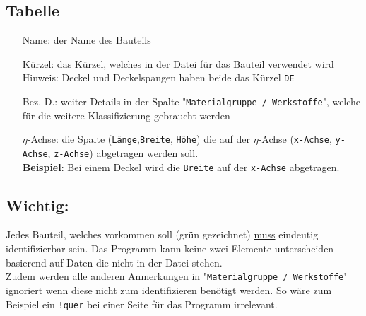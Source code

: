 \documentclass[12pt]{article}
\begin{document}
	\subsection{Tabelle}
		\begin{itemize}
			\item[Name:] der Name des Bauteils
			\item[Kürzel:] das Kürzel, welches in der Datei für das Bauteil verwendet wird\\ 
				Hinweis: Deckel und Deckelspangen haben beide das Kürzel \texttt{DE}
			\item[Bez.-D.:] weiter Details in der Spalte "\texttt{Materialgruppe / Werkstoffe}", welche für die weitere Klassifizierung gebraucht werden
			\item[$\eta$-Achse:] die Spalte (\texttt{Länge},\texttt{Breite}, \texttt{Höhe}) die auf der $\eta$-Achse (\texttt{x-Achse}, \texttt{y-Achse}, \texttt{z-Achse}) abgetragen werden soll.\\
			\textbf{Beispiel}: Bei einem Deckel wird die \texttt{Breite} auf der \texttt{x-Achse} abgetragen.
		\end{itemize}
	
	\subsection{Wichtig:}
		Jedes Bauteil, welches vorkommen soll (\color{green!50!black}grün\color{black}\xspace gezeichnet) \color{red}\underline{muss}\color{black}\xspace eindeutig identifizierbar sein. Das Programm kann keine zwei Elemente unterscheiden basierend auf Daten die nicht in der Datei stehen.\\
		Zudem werden alle anderen Anmerkungen in "\texttt{Materialgruppe / Werkstoffe}" ignoriert wenn diese nicht zum identifizieren benötigt werden. So wäre zum Beispiel ein \texttt{!quer} bei einer Seite für das Programm irrelevant.
\end{document}
